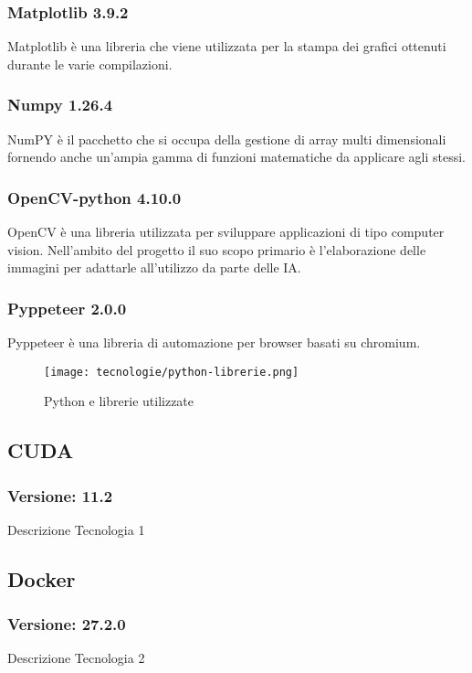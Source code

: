 \subsubsection{Matplotlib 3.9.2}
Matplotlib è una libreria che viene utilizzata per la stampa dei grafici ottenuti durante le varie compilazioni. 

\subsubsection{Numpy 1.26.4}
NumPY è il pacchetto che si occupa della gestione di array multi dimensionali fornendo anche un'ampia gamma di funzioni matematiche da applicare agli stessi.

\subsubsection{OpenCV-python 4.10.0}
OpenCV è una libreria utilizzata per sviluppare applicazioni di tipo computer vision. Nell'ambito del progetto il suo scopo primario è l'elaborazione delle immagini per adattarle all'utilizzo da parte delle IA. 

\subsubsection{Pyppeteer 2.0.0}
Pyppeteer è una libreria di automazione per browser basati su chromium.

\begin{figure}[!h] 
  \centering 
  \texttt{[image: tecnologie/python-librerie.png]} 
  \caption{Python e librerie utilizzate}
  \label{fig:logo-python}
\end{figure}



\subsection{CUDA}
\subsubsection{Versione: 11.2}
Descrizione Tecnologia 1

\subsection{Docker}
\subsubsection{Versione: 27.2.0}
Descrizione Tecnologia 2

